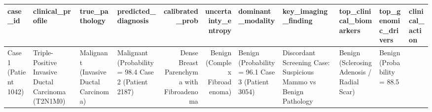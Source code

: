 \begin{tabular}{llllrrlllll}
\toprule
case_id & clinical_profile & true_pathology & predicted_diagnosis & calibrated_prob & uncertainty_entropy & dominant_modality & key_imaging_finding & top_clinical_biomarkers & top_genomic_drivers & clinical_action \\
\midrule
Case 1 (Patient 1042) & Triple-Positive Invasive Ductal Carcinoma (T2N1M0) & Malignant (Invasive Ductal Carcinoma) & Malignant (Probability = 98.4%
Case 2 (Patient 2187) & Dense Breast Parenchyma with Fibroadenoma & Benign (Complex Fibroadenoma) & Benign (Probability = 96.1%
Case 3 (Patient 3054) & Discordant Screening Case: Suspicious Mammo vs Benign Pathology & Benign (Sclerosing Adenosis / Radial Scar) & Benign (Probability = 88.5%
\bottomrule
\end{tabular}
